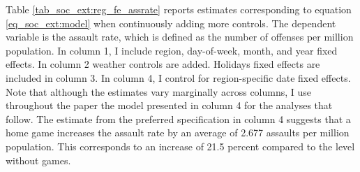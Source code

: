Table \ref{tab_soc_ext:reg_fe_assrate} reports estimates corresponding to equation \ref{eq_soc_ext:model} when continuously adding more controls. The dependent variable is the assault rate, which is defined as the number of offenses per million population. In column 1, I include region, day-of-week, month, and year fixed effects. In column 2 weather controls are added. Holidays fixed effects are included in column 3. In column 4, I control for region-specific date fixed effects. Note that although the estimates vary marginally across columns, I use throughout the paper the model presented in column 4 for the analyses that follow. The estimate from the preferred specification in column 4 suggests that a home game increases the assault rate by an average of 2.677 assaults per million population. This corresponds to an increase of 21.5 percent compared to the level without games.







